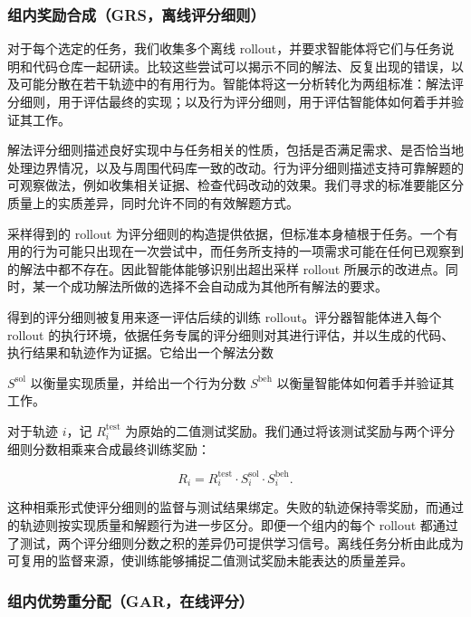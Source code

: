 \documentclass[
  10
]{article}
\begin{document}
\subsubsection{组内奖励合成（GRS，离线评分细则）}\label{groupwise-reward-synthesis-grs-offline-rubrics}

对于每个选定的任务，我们收集多个离线 rollout，并要求智能体将它们与任务说明和代码仓库一起研读。比较这些尝试可以揭示不同的解法、反复出现的错误，以及可能分散在若干轨迹中的有用行为。智能体将这一分析转化为两组标准：解法评分细则，用于评估最终的实现；以及行为评分细则，用于评估智能体如何着手并验证其工作。

解法评分细则描述良好实现中与任务相关的性质，包括是否满足需求、是否恰当地处理边界情况，以及与周围代码库一致的改动。行为评分细则描述支持可靠解题的可观察做法，例如收集相关证据、检查代码改动的效果。我们寻求的标准要能区分质量上的实质差异，同时允许不同的有效解题方式。

采样得到的 rollout 为评分细则的构造提供依据，但标准本身植根于任务。一个有用的行为可能只出现在一次尝试中，而任务所支持的一项需求可能在任何已观察到的解法中都不存在。因此智能体能够识别出超出采样 rollout 所展示的改进点。同时，某一个成功解法所做的选择不会自动成为其他所有解法的要求。

得到的评分细则被复用来逐一评估后续的训练 rollout。评分器智能体进入每个 rollout 的执行环境，依据任务专属的评分细则对其进行评估，并以生成的代码、执行结果和轨迹作为证据。它给出一个解法分数


\(S ^ { \mathrm { s o l } }\) 以衡量实现质量，并给出一个行为分数 \(S ^ { \mathrm { b e h } }\) 以衡量智能体如何着手并验证其工作。

对于轨迹 $i$，记 \(R _ { i } ^ { \mathrm { t e s t } }\) 为原始的二值测试奖励。我们通过将该测试奖励与两个评分细则分数相乘来合成最终训练奖励：

\[
R _ { i } = R _ { i } ^ { \mathrm { t e s t } } \cdot S _ { i } ^ { \mathrm { s o l } } \cdot S _ { i } ^ { \mathrm { b e h } } .\tag{2}
\]

这种相乘形式使评分细则的监督与测试结果绑定。失败的轨迹保持零奖励，而通过的轨迹则按实现质量和解题行为进一步区分。即便一个组内的每个 rollout 都通过了测试，两个评分细则分数之积的差异仍可提供学习信号。离线任务分析由此成为可复用的监督来源，使训练能够捕捉二值测试奖励未能表达的质量差异。

\subsubsection{组内优势重分配（GAR，在线评分）}\label{groupwise-advantage-redistribution-gar-online-grading}
\end{document}
